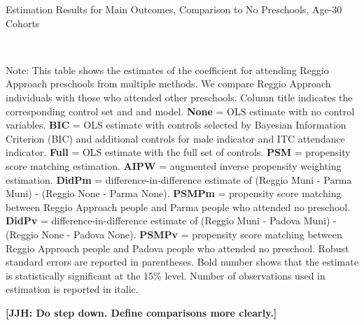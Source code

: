 \begin{table}[H] \caption{Estimation Results for Main Outcomes, Comparison to No Preschools, Age-30 Cohorts} \label{ols-M-adult30-reg-nopres}
\scalebox{0.65}{}
\vspace{1ex} \\
\footnotesize\raggedright{Note: This table shows the estimates of the coefficient for attending Reggio Approach preschools from multiple methods. We compare Reggio Approach individuals with those who attended other preschools. Column title indicates the corresponding control set and and model. \textbf{None} = OLS estimate with no control variables. \textbf{BIC} = OLS estimate with controls selected by Bayesian Information Criterion (BIC) and additional controls for male indicator and ITC attendance indicator. \textbf{Full} = OLS estimate with the full set of controls. \textbf{PSM} =  propensity score matching estimation. \textbf{AIPW} = augmented inverse propensity weighting estimation. \textbf{DidPm} = difference-in-difference estimate of (Reggio Muni - Parma Muni) - (Reggio None - Parma None). \textbf{PSMPm} = propensity score matching between Reggio Approach people and Parma people who attended no preschool. \textbf{DidPv} = difference-in-difference estimate of (Reggio Muni - Padova Muni) - (Reggio None - Padova None). \textbf{PSMPv} = propensity score matching between Reggio Approach people and Padova people who attended no preschool. Robust standard errors are reported in parentheses. Bold number shows that the estimate is statistically significant at the 15\% level. Number of observations used in estimation is reported in italic.}
\end{table}

\textbf{[JJH: Do step down. Define comparisons more clearly.]}

